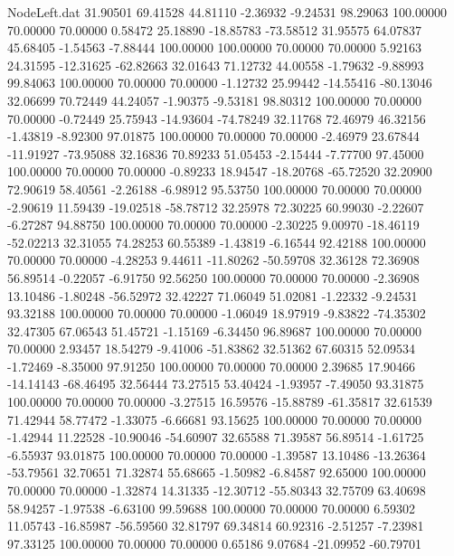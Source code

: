 \begin{filecontents}{NodeLeft.dat}
  31.90501   69.41528   44.81110    -2.36932   -9.24531   98.29063  100.00000   70.00000   70.00000    0.58472   25.18890  -18.85783  -73.58512
  31.95575   64.07837   45.68405    -1.54563   -7.88444  100.00000  100.00000   70.00000   70.00000    5.92163   24.31595  -12.31625  -62.82663
  32.01643   71.12732   44.00558    -1.79632   -9.88993   99.84063  100.00000   70.00000   70.00000   -1.12732   25.99442  -14.55416  -80.13046
  32.06699   70.72449   44.24057    -1.90375   -9.53181   98.80312  100.00000   70.00000   70.00000   -0.72449   25.75943  -14.93604  -74.78249
  32.11768   72.46979   46.32156    -1.43819   -8.92300   97.01875  100.00000   70.00000   70.00000   -2.46979   23.67844  -11.91927  -73.95088
  32.16836   70.89233   51.05453    -2.15444   -7.77700   97.45000  100.00000   70.00000   70.00000   -0.89233   18.94547  -18.20768  -65.72520
  32.20900   72.90619   58.40561    -2.26188   -6.98912   95.53750  100.00000   70.00000   70.00000   -2.90619   11.59439  -19.02518  -58.78712
  32.25978   72.30225   60.99030    -2.22607   -6.27287   94.88750  100.00000   70.00000   70.00000   -2.30225    9.00970  -18.46119  -52.02213
  32.31055   74.28253   60.55389    -1.43819   -6.16544   92.42188  100.00000   70.00000   70.00000   -4.28253    9.44611  -11.80262  -50.59708
  32.36128   72.36908   56.89514    -0.22057   -6.91750   92.56250  100.00000   70.00000   70.00000   -2.36908   13.10486   -1.80248  -56.52972
  32.42227   71.06049   51.02081    -1.22332   -9.24531   93.32188  100.00000   70.00000   70.00000   -1.06049   18.97919   -9.83822  -74.35302
  32.47305   67.06543   51.45721    -1.15169   -6.34450   96.89687  100.00000   70.00000   70.00000    2.93457   18.54279   -9.41006  -51.83862
  32.51362   67.60315   52.09534    -1.72469   -8.35000   97.91250  100.00000   70.00000   70.00000    2.39685   17.90466  -14.14143  -68.46495
  32.56444   73.27515   53.40424    -1.93957   -7.49050   93.31875  100.00000   70.00000   70.00000   -3.27515   16.59576  -15.88789  -61.35817
  32.61539   71.42944   58.77472    -1.33075   -6.66681   93.15625  100.00000   70.00000   70.00000   -1.42944   11.22528  -10.90046  -54.60907
  32.65588   71.39587   56.89514    -1.61725   -6.55937   93.01875  100.00000   70.00000   70.00000   -1.39587   13.10486  -13.26364  -53.79561
  32.70651   71.32874   55.68665    -1.50982   -6.84587   92.65000  100.00000   70.00000   70.00000   -1.32874   14.31335  -12.30712  -55.80343
  32.75709   63.40698   58.94257    -1.97538   -6.63100   99.59688  100.00000   70.00000   70.00000    6.59302   11.05743  -16.85987  -56.59560
  32.81797   69.34814   60.92316    -2.51257   -7.23981   97.33125  100.00000   70.00000   70.00000    0.65186    9.07684  -21.09952  -60.79701

\end{filecontents}

